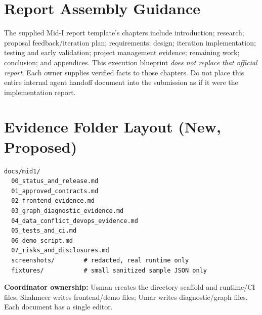\documentclass[11pt,a4paper,oneside]{report}
\begin{document}
\section{Report Assembly Guidance}
The supplied Mid-I report template's chapters include introduction; research; proposal feedback/iteration plan; requirements; design; iteration implementation; testing and early validation; project management evidence; remaining work; conclusion; and appendices. This execution blueprint \emph{does not replace that official report}. Each owner supplies verified facts to those chapters. Do not place this entire internal agent handoff document into the submission as if it were the implementation report.

\section{Evidence Folder Layout (New, Proposed)}
\begin{lstlisting}
docs/mid1/
  00_status_and_release.md
  01_approved_contracts.md
  02_frontend_evidence.md
  03_graph_diagnostic_evidence.md
  04_data_conflict_devops_evidence.md
  05_tests_and_ci.md
  06_demo_script.md
  07_risks_and_disclosures.md
  screenshots/        # redacted, real runtime only
  fixtures/           # small sanitized sample JSON only
\end{lstlisting}
\textbf{Coordinator ownership:} Usman creates the directory scaffold and runtime/CI files; Shahmeer writes frontend/demo files; Umar writes diagnostic/graph files. Each document has a single editor.
\end{document}
